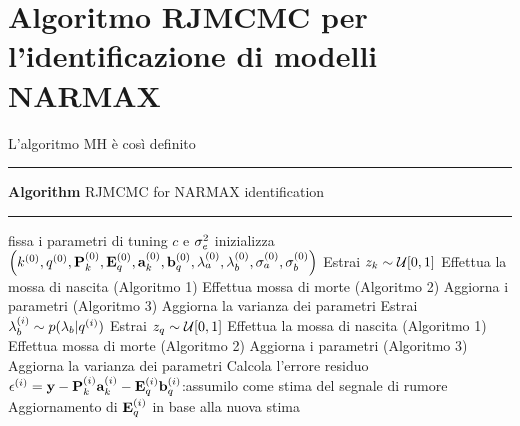 \chapter{Algoritmo RJMCMC per
l’identificazione di modelli
NARMAX}

 L'algoritmo MH è così definito\vspace{1em}\\
\hrule 
\textbf{Algorithm} RJMCMC for NARMAX identification
\hrule



\begin{algorithmic}
\State fissa i parametri di tuning $c$ e $\sigma_e^2$
\State inizializza$\left(k^{(0)},q^{(0)},\textbf{P}_k^{(0)},\textbf{E}_q^{(0)},\textbf{a}_k^{(0)},\textbf{b}_q^{(0)},\lambda_a^{(0)},\lambda_b^{(0)},\sigma_a^{(0)},\sigma_b^{(0)}\right)$
\vspace{2em}
    \State Estrai $z_k\sim \mathcal{U}[0,1]$
    \State Effettua la mossa di nascita (Algoritmo 1)
\State Effettua mossa di morte (Algoritmo 2)
\Else
\State Aggiorna i parametri (Algoritmo 3)
\State Aggiorna la varianza dei  parametri
\EndIf
\State Estrai $\lambda_b^{(i)}\sim p(\lambda_b|q^{(i)})$
\vspace{2em}
    \State Estrai $z_q\sim \mathcal{U}[0,1]$
    \State Effettua la mossa di nascita (Algoritmo 1)
\State Effettua mossa di morte (Algoritmo 2)
\Else
\State Aggiorna i parametri (Algoritmo 3)
\State Aggiorna la varianza dei  parametri
\EndIf
\EndIf
\vspace{2em}
\State Calcola l'errore residuo $\epsilon^{(i)}=\textbf{y}-\textbf{P}_k^{(i)}\textbf{a}_k^{(i)}-\textbf{E}_q^{(i)}\textbf{b}_q^{(i)}$:assumilo come stima del segnale di  rumore
\State Aggiornamento di $\textbf{E}_q^{(i)}$ in base alla nuova stima
\EndFor
\end{algorithmic}

